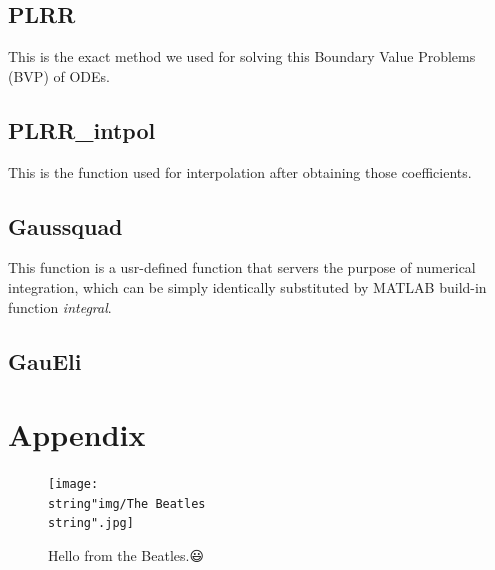 \documentclass[a4paper,english]{article}
\begin{document}
	
	
	\subsection{PLRR}
	This is the exact method we used for solving this Boundary Value Problems 
	(BVP) of ODEs. 
	
	
	\subsection{PLRR\_intpol}
	This is the function used for interpolation after obtaining those
	coefficients.
	
	
	\subsection{Gaussquad}
	This function is a usr-defined function that servers the purpose of 
	numerical integration, which can be simply identically substituted by
	MATLAB build-in function \emph{integral}.
	
	
	\subsection{GauEli}	
	
	
	
	
	\section{Appendix}
	\begin{figure}[!hb]
		\centering
		\texttt{[image: \\string"img/The 
		Beatles\\string".jpg]}
		\caption*{Hello from the Beatles.😃}
		\label{fig:the-beatles}
	\end{figure}
	
\end{document}
